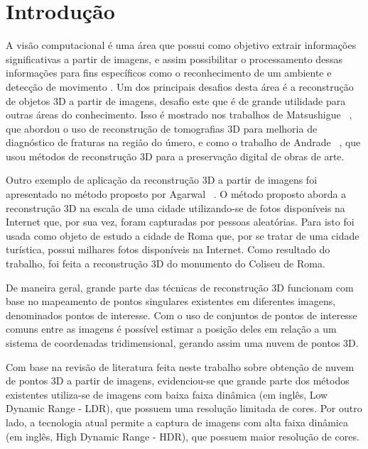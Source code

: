 \chapter{Introdução} \label{introducao}
A visão computacional é uma área que possui como objetivo extrair informações significativas a partir de imagens, e assim possibilitar o processamento dessas informações para fins específicos como o reconhecimento de um ambiente e detecção de movimento \cite{ballard&brown}. Um dos principais desafios desta área é a reconstrução de objetos 3D a partir de imagens, desafio este que é de grande utilidade para outras áreas do conhecimento. Isso é mostrado nos trabalhos de Matsushigue \etal~\cite{matsushigue}, que abordou o uso de reconstrução de tomografias 3D para melhoria de diagnóstico de fraturas na região do úmero, e como o trabalho de Andrade \etal~\cite{beatriz}, que usou métodos de reconstrução 3D para a preservação digital de obras de arte.


Outro exemplo de aplicação da reconstrução 3D a partir de imagens foi apresentado no método proposto por Agarwal \etal~\cite{agarwal}. O método proposto aborda a reconstrução 3D na escala de uma cidade utilizando-se de fotos disponíveis na Internet que, por sua vez, foram capturadas por pessoas aleatórias. Para isto foi usada como objeto de estudo a cidade de Roma que, por se tratar de uma cidade turística, possui milhares fotos disponíveis na Internet. Como resultado do trabalho, foi feita a reconstrução 3D do monumento do Coliseu de Roma.


De maneira geral, grande parte das técnicas de reconstrução 3D funcionam com base no mapeamento de pontos singulares existentes em diferentes imagens, denominados pontos de interesse. Com o uso de conjuntos de pontos de interesse comuns entre as imagens é possível estimar a posição deles em relação a um sistema de coordenadas tridimensional, gerando assim uma nuvem de pontos 3D.


Com base na revisão de literatura feita neste trabalho sobre obtenção de nuvem de pontos 3D a partir de imagens, evidenciou-se que grande parte dos métodos existentes utiliza-se de imagens com baixa faixa dinâmica (em inglês, Low Dynamic Range - LDR), que possuem uma resolução limitada de cores. Por outro lado, a tecnologia atual permite a captura de imagens com alta faixa dinâmica (em inglês, High Dynamic Range - HDR), que possuem maior resolução de cores.

